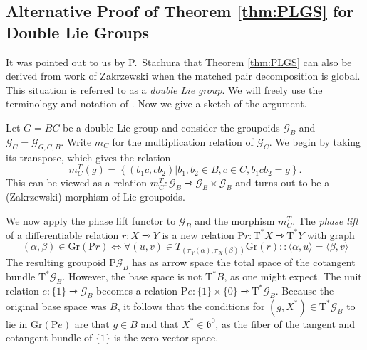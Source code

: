 \documentclass[a4paper,11pt]{amsart}
\newcommand{\s}[1]{\mathcal{#1}}
\newcommand{\fr}[1]{\mathfrak{#1}}
\newcommand{\rP}{\mathrm P}
\newcommand{\rT}{\mathrm T}
\newcommand{\Gr}{\mathrm{Gr}}
\theoremstyle{definition}
\theoremstyle{remark}
\begin{document}
\subsection{Alternative Proof of Theorem \ref{thm:PLGS} for Double Lie Groups}

It was pointed out to us by P.\ Stachura that Theorem \ref{thm:PLGS} can also be derived from work of Zakrzewski \cite{MR1081011} when the matched pair decomposition is global.
This situation is referred to as a \emph{double Lie group}.
We will freely use the terminology and notation of \cite{MR1764452}.
Now we give a sketch of the argument.

Let $G = BC$ be a double Lie group and consider the groupoids $\s{G}_B$ and $\s{G}_C = \s{G}_{G,C,B}$.
Write $m_C$ for the multiplication relation of $\s{G}_C$.
We begin by taking its transpose, which gives the relation
\begin{equation*}
	m_C^T (g) = \left\{ \left. (b_1 c , c b_2) \right| b_1,b_2 \in B, c \in C, b_1 c b_2 = g \right\} .
\end{equation*}
This can be viewed as a relation $m_C^T \colon \s{G}_B \rightarrowtriangle \s{G}_B \times \s{G}_B$ and turns out to be a (Zakrzewski) morphism of Lie groupoids.

We now apply the phase lift functor to $\s{G}_B$ and the morphism $m_C^T$.
The \emph{phase lift} of a differentiable relation $r \colon X \rightarrowtriangle Y$ is a new relation $\rP r \colon \rT^* X \rightarrowtriangle \rT^* Y$ with graph
\begin{equation*}
	(\alpha,\beta) \in \Gr(\rP r) \Leftrightarrow \forall (u, v) \in T_{(\pi_Y(\alpha),\pi_X(\beta))} \Gr(r) \colon: \langle \alpha , u \rangle = \langle \beta , v \rangle
\end{equation*}
The resulting groupoid $\rP \s{G}_B$ has as arrow space the total space of the cotangent bundle $\rT^* \s{G}_B$.
However, the base space is not $\rT^* B$, as one might expect.
The unit relation $e \colon \{ 1 \} \rightarrowtriangle \s{G}_B$ becomes a relation $\rP e \colon \{ 1 \} \times \{ 0 \} \rightarrowtriangle \rT^* \s{G}_B$.
Because the original base space was $B$, it follows that the conditions for $(g,X^*) \in \rT^* \s{G}_B$ to lie in $\Gr(\rP e)$ are that $g \in B$ and that $X^* \in \fr{b}^0$, as the fiber of the tangent and cotangent bundle of $\{ 1 \}$ is the zero vector space.
\end{document}
